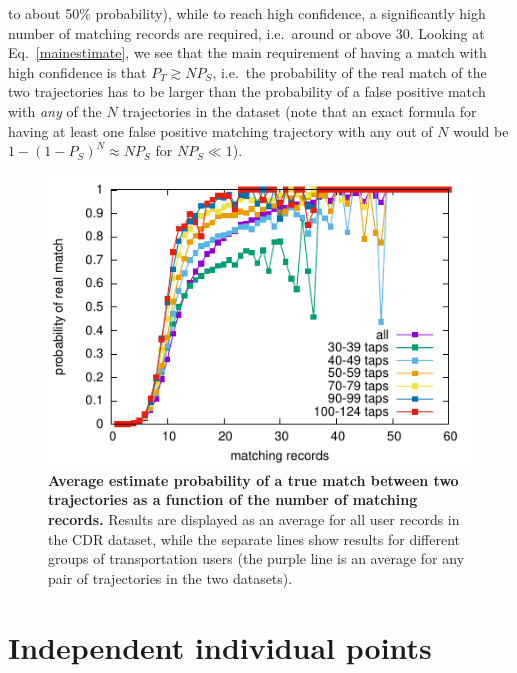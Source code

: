 \documentclass[a4paper]{article}
\begin{document}
		to about 50\% probability), while to reach high confidence, a significantly high number of matching records are required, i.e.~around or above
		30. Looking at Eq.~\ref{mainestimate}, we see that the main requirement of having a match with high confidence is that $P_T \gtrsim N P_S$,
		i.e.~the probability of the real match of the two trajectories has to be larger than the probability of a false positive match with \emph{any}
		of the $N$ trajectories in the dataset (note that an exact formula for having at least one false positive matching trajectory with any out of
		$N$ would be $1 - (1-P_S)^N \approx N P_S$ for $N P_S \ll 1$).
		
		\begin{figure}
			\centering
			\includegraphics{bayes_est1}
			\caption{{\bf Average estimate probability of a true match between two trajectories as a function of the number of matching records.}
				Results are displayed as an average for all user records in the CDR dataset, while the separate lines show results for different
				groups of transportation users (the purple line is an average for any pair of trajectories in the two datasets).}
			\label{bayes_est1}
		\end{figure}
	
	
	\section{Independent individual points}	
		
\end{document}
